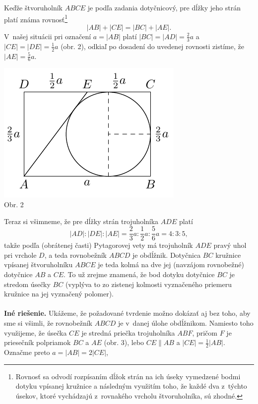 \rieh Keďže štvoruholník $ABCE$ je podľa zadania dotyčnicový, pre dĺžky jeho strán platí známa rovnosť\footnote{Rovnosť sa odvodí rozpísaním dĺžok strán na ich úseky vymedzené bodmi dotyku vpísanej kružnice a následným využitím toho, že každé dva z~týchto úsekov, ktoré vychádzajú z~rovnakého vrcholu
štvoruholníka, sú zhodné.}
$$|AB| + |CE| = |BC| + |AE|.$$
V~našej situácii pri označení $a = |AB|$ platí $|BC| = |AD| = \frac{2}{3}a$ a $|CE| = |DE| =\frac{1}{2}a$
(obr. 2), odkiaľ po dosadení do uvedenej rovnosti zistíme, že $|AE| = \frac{5}{6}a$.
\begin{center}
\includegraphics{obrazky/61K31}\\

Obr. 2
\end{center}
Teraz si všimneme, že pre dĺžky strán trojuholníka $ADE$ platí
$$|AD| : |DE| : |AE| = \frac{2}{3}a : \frac{1}{2}a : \frac{5}{6}a = 4 : 3 : 5,$$
takže podľa (obrátenej časti) Pytagorovej vety má trojuholník $ADE$ pravý uhol pri vrchole $D$, a teda rovnobežník $ABCD$ je obdĺžnik. Dotyčnica $BC$ kružnice vpísanej štvoruholníku $ABCE$ je teda kolmá na dve jej (navzájom rovnobežné) dotyčnice $AB$ a $CE$. To už zrejme znamená, že bod dotyku dotyčnice $BC$ je stredom úsečky $BC$ (vyplýva to zo zistenej kolmosti vyznačeného priemeru kružnice na jej vyznačený
polomer).\\
\\
\textbf{Iné riešenie.} Ukážeme, že požadované tvrdenie možno dokázať aj bez toho, aby sme si všimli, že rovnobežník $ABCD$ je v~danej úlohe obdĺžnikom. Namiesto toho využijeme, že úsečka $CE$ je stredná priečka trojuholníka $ABF$, pričom $F$ je priesečník polpriamok $BC$ a $AE$ (obr. 3), lebo $CE \parallel AB$ a $|CE| =\frac{1}{2}|AB|$. Označme preto $a = |AB| = 2|CE|$,
